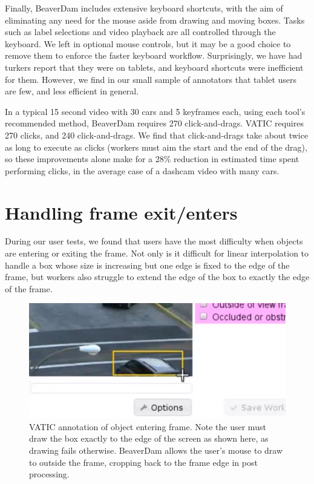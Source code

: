 Finally, BeaverDam includes extensive keyboard shortcuts, with the aim of eliminating any need for the mouse aside from drawing and moving boxes.
Tasks such as label selections and video playback are all controlled through the keyboard.
We left in optional mouse controls, but it may be a good choice to remove them to enforce the faster keyboard workflow.
Surprisingly, we have had turkers report that they were on tablets, and keyboard shortcuts were inefficient for them.
However, we find in our small sample of annotators that tablet users are few, and less efficient in general.

In a typical 15 second video with 30 cars and 5 keyframes each, using each tool's recommended method, BeaverDam requires 270 click-and-drags. VATIC requires 270 clicks, and 240 click-and-drags. We find that click-and-drags take about twice as long to execute as clicks (workers must aim the start and the end of the drag), so these improvements alone make for a 28\% reduction in estimated time spent performing clicks, in the average case of a dashcam video with many cars.

\section{Handling frame exit/enters}

During our user tests, we found that users have the most difficulty when objects are entering or exiting the frame.
Not only is it difficult for linear interpolation to handle a box whose size is increasing but one edge is fixed to the edge of the frame, but workers also struggle to extend the edge of the box to exactly the edge of the frame.

\begin{figure}[h]
\includegraphics[width=14cm]{figs/vatic_border.png}
\centering
\caption{VATIC annotation of object entering frame. Note the user must draw the box exactly to the edge of the screen as shown here, as drawing fails otherwise. BeaverDam allows the user's mouse to draw to outside the frame, cropping back to the frame edge in post processing.}
\end{figure}

